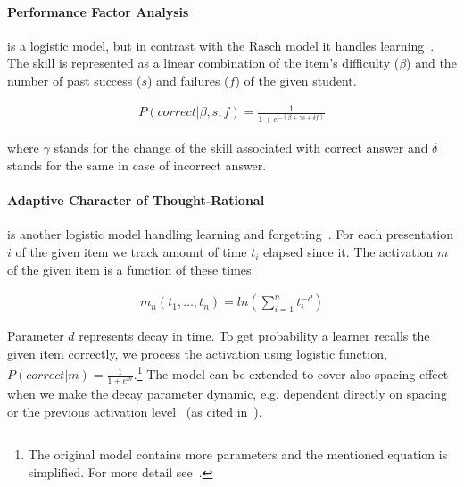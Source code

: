 \documentclass[table,color,cover,twoside,nolot,nolof]{fithesis3/fithesis3}
\begin{document}
\paragraph*{Performance Factor Analysis} is a logistic model, but in contrast
with the Rasch model it handles learning~\cite{pavlik2009performance}. The
skill is represented as a linear combination of the item's difficulty ($\beta$)
and the number of past success ($s$) and failures ($f$) of the given student.

\begin{align}
P(correct|\beta,s, f) = \frac{1}{1 + e^{-(\beta + \gamma s + \delta f)}}
\end{align}

where $\gamma$ stands for the change of the skill associated with correct
answer and $\delta$ stands for the same in case of incorrect answer.

\paragraph*{Adaptive Character of Thought-Rational} is another logistic model
handling learning and forgetting~\cite{pavlik2005practice}. For each
presentation $i$ of the given item we track amount of time $t_i$ elapsed since
it. The activation $m$ of the given item is a function of these times:

\begin{align}
m_n(t_1, \ldots, t_n) = ln\left(\sum_{i=1}^n t_i^{-d}\right)
\end{align}

Parameter $d$ represents decay in time. To get probability a learner recalls
the given item correctly, we process the activation using logistic function,
$P(correct|m) = \frac{1}{1 + e^{m}}$.\footnote{The original model contains more
parameters and the mentioned equation is simplified. For more detail
see~\cite{pavlik2005practice}.} The model can be extended to cover also spacing
effect when we make the decay parameter dynamic, e.g. dependent directly on
spacing or the previous activation level~\cite{anderson1991reflections} (as
cited in~\cite{pavlik2005practice}).

\bigskip
\end{document}
